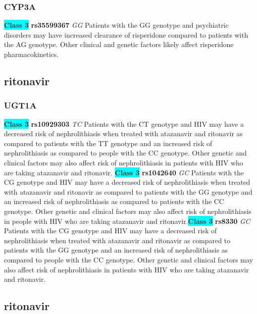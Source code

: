 \documentclass{book}
\begin{document}
\subsubsection{ CYP3A }

\begin{center}
\textbf{\colorbox{cyan} {Class 3}} \textbf{ rs35599367 } \textit{ GG }
Patients with the GG genotype and psychiatric disorders may have increased clearance of risperidone compared to patients with the AG genotype. Other clinical and genetic factors likely affect risperidone pharmacokinetics.


\end{center}\subsection{ ritonavir }


\subsubsection{ UGT1A }

\begin{center}
\textbf{\colorbox{cyan} {Class 3}} \textbf{ rs10929303 } \textit{ TC }
Patients with the CT genotype and HIV may have a decreased risk of nephrolithiasis when treated with atazanavir and ritonavir as compared to patients with the TT genotype and an increased risk of nephrolithiasis as compared to people with the CC genotype. Other genetic and clinical factors may also affect risk of nephrolithiasis in patients with HIV who are taking atazanavir and ritonavir. \textbf{\colorbox{cyan} {Class 3}} \textbf{ rs1042640 } \textit{ GC }
Patients with the CG genotype and HIV may have a decreased risk of nephrolithiasis when treated with atazanavir and ritonavir as compared to patients with the GG genotype and an increased risk of nephrolithiasis as compared to patients with the CC genotype. Other genetic and clinical factors may also affect risk of nephrolithiasis in people with HIV who are taking atazanavir and ritonavir.\textbf{\colorbox{cyan} {Class 3}} \textbf{ rs8330 } \textit{ GC }
Patients with the CG genotype and HIV may have a decreased risk of nephrolithiasis when treated with atazanavir and ritonavir as compared to patients with the GG genotype and an increased risk of nephrolithiasis as compared to people with the CC genotype. Other genetic and clinical factors may also affect risk of nephrolithiasis in patients with HIV who are taking atazanavir and ritonavir.


\end{center}\subsection{ ritonavir }
\end{document}
